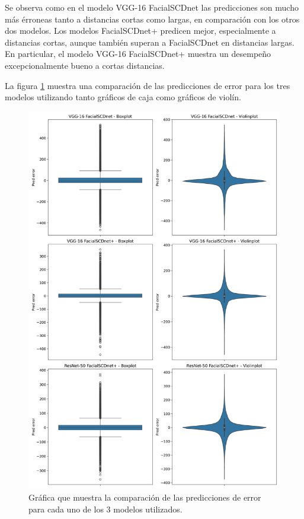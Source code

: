 Se observa como en el modelo VGG-16 FacialSCDnet las predicciones son mucho más érroneas tanto a distancias cortas como largas, en comparación con los otros dos modelos. Los modelos FacialSCDnet+ predicen mejor, especialmente a distancias cortas, aunque también superan a FacialSCDnet en distancias largas. En particular, el modelo VGG-16 FacialSCDnet+ muestra un desempeño excepcionalmente bueno a cortas distancias.

La figura \ref{fig33} muestra una comparación de las predicciones de error para los tres modelos utilizando tanto gráficos de caja como gráficos de violín.

\begin{figure}[h]
	\centering
	\includegraphics[width=\textwidth]{imagenes/cap5/boxplot_violinplot_comparison_own.png}
	\caption[Comparación predicciones de error test FacialSCDnet+.]{Gráfica que muestra la comparación de las predicciones de error para cada uno de los 3 modelos utilizados.}
	\label{fig33}
\end{figure}

